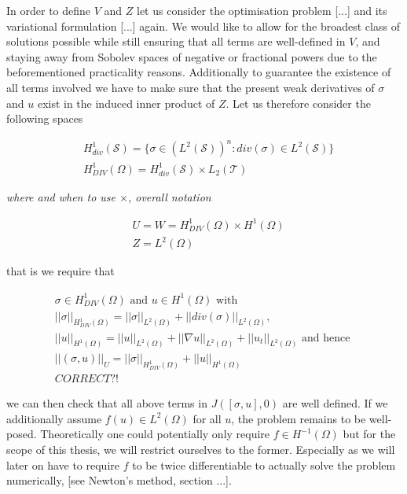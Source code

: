 \documentclass[../draft_1.tex]{subfiles}
\begin{document}
In order to define $V$ and $Z$ let us consider the optimisation problem [...] and its variational formulation [...] again. We would like to allow for the broadest class of solutions possible while still ensuring that all terms are well-defined in $V$, and staying away from Sobolev spaces of negative or fractional powers due to the beforementioned practicality reasons. Additionally to guarantee the existence of all terms involved we have to make sure that the present weak derivatives of $\sigma$ and $u$ exist in the induced inner product of $Z$. Let us therefore consider the following spaces 
\begin{ceqn}
	\begin{align}
	&H_{div}^1(\mathcal{S}) = \{\sigma \in (L^2(\mathcal{S}))^n : div (\sigma) \in L^2(\mathcal{S})\} \\
    &H_{DIV}^1(\Omega) = H_{div}^1(\mathcal{S}) \times L_2(\mathcal{T}) 
    	\end{align}
\end{ceqn}
\textit{where and when to use $\times$, overall notation}
\begin{ceqn}
	\begin{align}
    & U = W = H_{DIV}^1(\Omega) \times H^1(\Omega) \\
    & Z = L^2(\Omega)
	\end{align}
\end{ceqn}
that is we require that 
\begin{ceqn}
	\begin{align}
\sigma \in H_{DIV}^1(\Omega) \text{  and  } u \in H^1(\Omega) \text { with } \\
|| \sigma ||_{H_{DIV}^1(\Omega)} = || \sigma ||_{L^2(\Omega)} + || div(\sigma) ||_{L^2(\Omega)}, \\
 ||u ||_{H^1(\Omega)} = || u ||_{L^2(\Omega)} + || \nabla u ||_{L^2(\Omega)} + || u_t ||_{L^2(\Omega)} \text{ and hence } \\
 || (\sigma, u) ||_U = || \sigma ||_{H_{DIV}^1(\Omega)} + || u ||_{H^1(\Omega)} \\
 CORRECT ?!
	\end{align}
\end{ceqn}
we can then check that all above terms in $J([\sigma, u], 0)$ are well defined. If we additionally assume $f(u) \in L^2(\Omega)$ for all $u$, the problem remains to be well-posed. Theoretically one could potentially only require $f \in H^{-1}(\Omega)$ but for the scope of this thesis, we will restrict ourselves to the former. Especially as we will later on have to require $f$ to be twice differentiable to actually solve the problem numerically, [see Newton's method, section ...].\\
\end{document}
